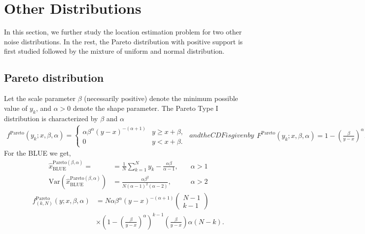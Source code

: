 \documentclass[journal]{IEEEtran}
\newcommand{\Var}{\mathrm{Var}}
\begin{document}
\section{Other Distributions}\label{sec:other_distributions}
In this section, we further study the location estimation problem for two other noise distributions. In the rest, the Pareto distribution with positive support is first studied followed by the mixture of uniform and normal distribution.

\subsection{Pareto distribution} 
Let the scale parameter $\beta$ (necessarily positive) denote the minimum possible value of $y_k$, and $\alpha>0$ denote the shape parameter. The Pareto Type I distribution is characterized by $\beta$ and $\alpha$
%
%
\begin{subequations}\label{eq:pareto}
	\begin{align}
	f^{\mathrm{Pareto}}(y_k;x,\beta,\alpha)=\left\{\begin{matrix}
	\alpha\beta^\alpha (y-x)^{-(\alpha+1)}&y\geq x+\beta, \\ 
	0&y< x+\beta. 
	\end{matrix}\right.
	\label{eq:pareto_pdf}
	\end{align}
	and the CDF is given by
	\begin{align}
	F^{\mathrm{Pareto}}(y_k;x,\beta,\alpha)=1-\left(\frac{\beta}{y-x}\right)^\alpha.
	\label{eq:pareto_cdf}
	\end{align}
\end{subequations}
%
%
For the BLUE we get,
%
%
\begin{subequations}
	\begin{align}
	\hat{x}_{\mathrm{BLUE}}^{\mathrm{Pareto}(\beta,\alpha)} = &= \frac{1}{N}\sum_{k=1}^{N}y_k - \frac{\alpha\beta}{\alpha-1},&\quad \alpha>1
	\\
	\Var(\hat{x}_{\mathrm{BLUE}}^{\mathrm{Pareto}(\beta,\alpha)}) &=\frac{\alpha\beta^2}{N(\alpha-1)^2(\alpha-2)},&\quad \alpha>2
	\end{align}
\end{subequations}
%
%
%
%
\begin{align}
f^{\mathrm{Pareto}}_{(k,N)}(y;x,\beta,\alpha) &= N\alpha\beta^\alpha (y-x)^{-(\alpha+1)}\begin{pmatrix}N-1\\k-1\end{pmatrix}\nonumber\\&\times\left(1-(\frac{\beta}{y-x})^\alpha\right)^{k-1}\left(\frac{\beta}{y-x}\right){\alpha(N-k)}.
\label{eq:pareto_order}
\end{align}
\end{document}
